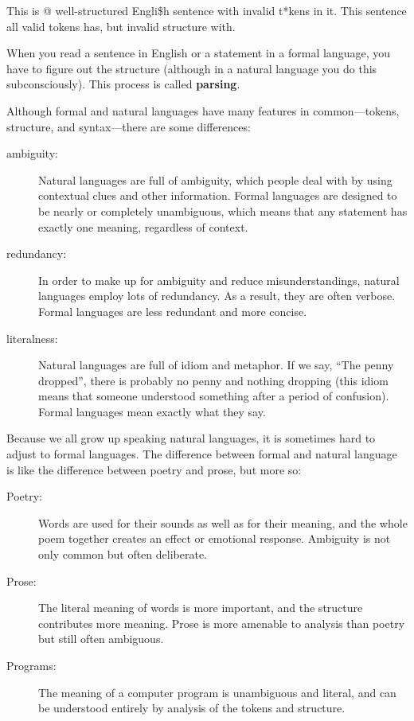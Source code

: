 This is @ well-structured Engli\$h
sentence with invalid t*kens in it. This sentence all valid tokens
has, but invalid structure with.

When you read a sentence in English or a statement in a formal
language, you have to figure out the structure
(although in a natural language you do this subconsciously). This
process is called {\bf parsing}.

Although formal and natural languages have many features in
common---tokens, structure, and syntax---there are some
differences:

\begin{description}

\item[ambiguity:] Natural languages are full of ambiguity, which
people deal with by using contextual clues and other information.
Formal languages are designed to be nearly or completely unambiguous,
which means that any statement has exactly one meaning,
regardless of context.

\item[redundancy:] In order to make up for ambiguity and reduce
misunderstandings, natural languages employ lots of
redundancy. As a result, they are often verbose. Formal languages
are less redundant and more concise.

\item[literalness:] Natural languages are full of idiom and metaphor.
If we say, ``The penny dropped'', there is probably no penny and
nothing dropping (this idiom means that someone understood something
after a period of confusion). Formal languages
mean exactly what they say.

\end{description}

Because we all grow up speaking natural languages, it is sometimes
hard to adjust to formal languages. The difference between formal and
natural language is like the difference between poetry and prose, but
more so:  

\begin{description}

\item[Poetry:] Words are used for their sounds as well as for
their meaning, and the whole poem together creates an effect or
emotional response. Ambiguity is not only common but often
deliberate.

\item[Prose:] The literal meaning of words is more important,
and the structure contributes more meaning. Prose is more amenable to
analysis than poetry but still often ambiguous.

\item[Programs:] The meaning of a computer program is unambiguous
and literal, and can be understood entirely by analysis of the
tokens and structure.

\end{description}

